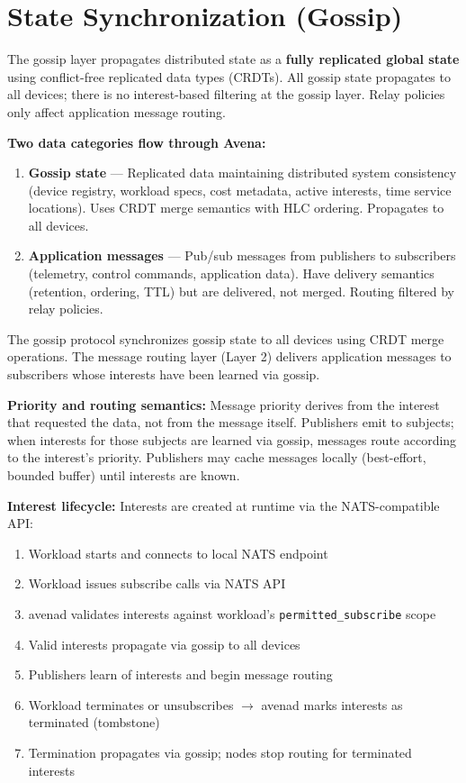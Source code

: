 \section{State Synchronization (Gossip)}
\label{sec:gossip}

The gossip layer propagates distributed state as a \textbf{fully replicated global state} using conflict-free replicated data types (CRDTs). All gossip state propagates to all devices; there is no interest-based filtering at the gossip layer. Relay policies only affect application message routing.

\textbf{Two data categories flow through Avena:}

\begin{enumerate}
    \item \textbf{Gossip state} --- Replicated data maintaining distributed system consistency (device registry, workload specs, cost metadata, active interests, time service locations). Uses CRDT merge semantics with HLC ordering. Propagates to all devices.
    
    \item \textbf{Application messages} --- Pub/sub messages from publishers to subscribers (telemetry, control commands, application data). Have delivery semantics (retention, ordering, TTL) but are delivered, not merged. Routing filtered by relay policies.
\end{enumerate}

The gossip protocol synchronizes gossip state to all devices using CRDT merge operations. The message routing layer (Layer 2) delivers application messages to subscribers whose interests have been learned via gossip.

\textbf{Priority and routing semantics:} Message priority derives from the interest that requested the data, not from the message itself. Publishers emit to subjects; when interests for those subjects are learned via gossip, messages route according to the interest's priority. Publishers may cache messages locally (best-effort, bounded buffer) until interests are known.

\textbf{Interest lifecycle:} Interests are created at runtime via the NATS-compatible API:
\begin{enumerate}
    \item Workload starts and connects to local NATS endpoint
    \item Workload issues subscribe calls via NATS API
    \item avenad validates interests against workload's \texttt{permitted\_subscribe} scope
    \item Valid interests propagate via gossip to all devices
    \item Publishers learn of interests and begin message routing
    \item Workload terminates or unsubscribes $\rightarrow$ avenad marks interests as terminated (tombstone)
    \item Termination propagates via gossip; nodes stop routing for terminated interests
\end{enumerate}

